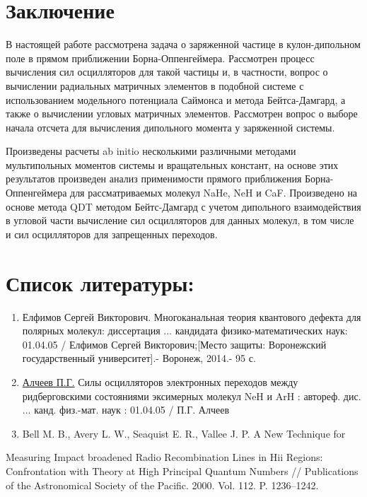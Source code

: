 \documentclass[a4paper]{article}
\newcommand\liststyleWWNumi{%
\renewcommand\theenumi{\arabic{enumi}}
\renewcommand\theenumii{\Roman{enumii}}
\renewcommand\theenumiii{\roman{enumiii}}
\renewcommand\theenumiv{\arabic{enumiv}}
\renewcommand\labelenumi{\theenumi.}
\renewcommand\labelenumii{\theenumii.}
\renewcommand\labelenumiii{\theenumiii.}
\renewcommand\labelenumiv{\theenumiv.}
}
\begin{document}
\bigskip

\clearpage\section[Заключение]{Заключение}
\hypertarget{RefHeading4707463868395}{}В настоящей
работе рассмотрена задача о заряженной частице в кулон-дипольном поле в прямом приближении Борна-Оппенгеймера. Рассмотрен процесс вычисления сил осцилляторов для такой частицы и, в частности, вопрос о вычислении радиальных матричных элементов в подобной системе с использованием модельного потенциала Саймонса и метода Бейтса-Дамгард, а также о вычислении угловых матричных элементов. Рассмотрен вопрос о выборе начала отсчета для вычисления дипольного момента у заряженной системы.

Произведены
расчеты \foreignlanguage{english}{ab} \foreignlanguage{english}{initio}
несколькими различными методами мультипольных моментов системы и вращательных констант, на основе этих результатов произведен анализ применимости прямого приближения Борна-Оппенгеймера для рассматриваемых
молекул \foreignlanguage{english}{NaHe}, \foreignlanguage{english}{NeH}
и \foreignlanguage{english}{CaF}. Произведено
на основе метода
\foreignlanguage{english}{QDT} методом
Бейтс-Дамгард с учетом дипольного взаимодействия в угловой части вычисление сил осцилляторов для данных молекул, в том числе и сил осцилляторов для запрещенных переходов.


\bigskip

\clearpage\section[Список
литературы:]{Список
литературы:}
\hypertarget{RefHeading4709463868395}{}\liststyleWWNumi
\begin{enumerate}
\item Елфимов Сергей
Викторович. Многоканальная теория квантового дефекта для полярных молекул: диссертация ... кандидата физико-математических
наук: 01.04.05 / Елфимов
Сергей
Викторович;[Место
защиты: Воронежский государственный
университет].-
Воронеж, 2014.- 95 с. 
\item
\href{http://xn--90ax2c.xn--p1ai/search/?f_field%5bauthorbook%5d=f/authorbook/%D0%B0%D0%BB%D1%87%D0%B5%D0%B5%D0%B2+%D0%BF.%D0%B3.}{Алчеев П.Г.} Силы осцилляторов электронных переходов между ридберговскими состояниями эксимерных молекул NeH и ArH : автореф. дис. ... канд. физ.-мат. наук : 01.04.05 / П.Г. Алчеев
\item \foreignlanguage{english}{Bell M. B., Avery L. W., Seaquist E. R., Vallee J. P. A New Technique for}
\end{enumerate}
\foreignlanguage{english}{Measuring Impact broadened Radio Recombination Lines in Hii Regions: Confrontation with Theory
at High Principal Quantum Numbers // Publications of the Astronomical Society of the Pacific. 2000. Vol. 112. P.
1236--1242.}
\end{document}
